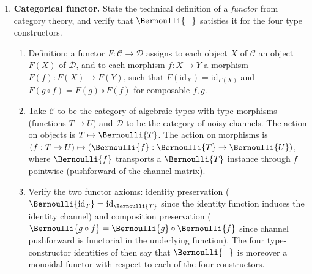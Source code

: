 \begin{enumerate}

\item \exstarstarstar
\label{ex:ch13-9}
\textbf{Categorical functor.}
State the technical definition of a \emph{functor} from category
theory, and verify that $\Bernoulli{-}$ satisfies it for the four
type constructors.
\begin{enumerate}
  \item[(a)] Definition: a functor $F : \mathcal{C} \to \mathcal{D}$
    assigns to each object $X$ of $\mathcal{C}$ an object $F(X)$ of
    $\mathcal{D}$, and to each morphism $f : X \to Y$ a morphism
    $F(f) : F(X) \to F(Y)$, such that $F(\mathrm{id}_X) =
    \mathrm{id}_{F(X)}$ and $F(g \circ f) = F(g) \circ F(f)$ for
    composable $f, g$.
  \item[(b)] Take $\mathcal{C}$ to be the category of algebraic
    types with type morphisms (functions $T \to U$) and
    $\mathcal{D}$ to be the category of noisy channels. The action
    on objects is $T \mapsto \Bernoulli{T}$. The action on
    morphisms is $(f : T \to U) \mapsto (\Bernoulli{f} :
    \Bernoulli{T} \to \Bernoulli{U})$, where $\Bernoulli{f}$
    transports a $\Bernoulli{T}$ instance through $f$ pointwise
    (pushforward of the channel matrix).
  \item[(c)] Verify the two functor axioms: identity preservation
    ($\Bernoulli{\mathrm{id}_T} = \mathrm{id}_{\Bernoulli{T}}$ since
    the identity function induces the identity channel) and
    composition preservation ($\Bernoulli{g \circ f} = \Bernoulli{g}
    \circ \Bernoulli{f}$ since channel pushforward is functorial in
    the underlying function). The four type-constructor identities
    of  then say that $\Bernoulli{-}$
    is moreover a monoidal functor with respect to each of the four
    constructors.
\end{enumerate}


\end{enumerate}
